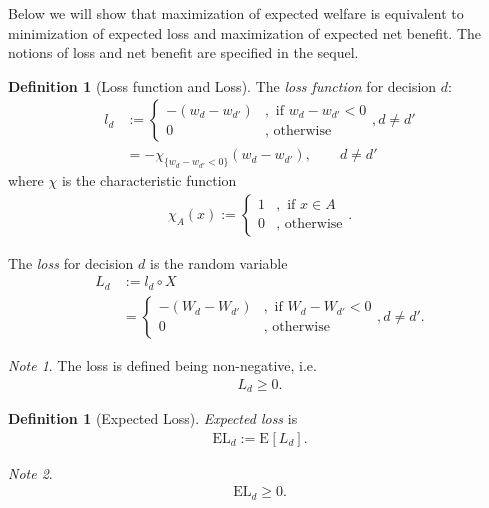 \documentclass[a4paper,10pt,twoside,pagesize,abstracton]{scrartcl}
\newcommand{\E}[2][]{\mathrm{E}_{#1}\left[#2\right]} %
\newcommand{\EL}{\mathrm{EL}} %
\theoremstyle{plain}%
\theoremstyle{definition}
\newtheorem{defn}[thm]{Definition}
\theoremstyle{remark}
\newtheorem*{note}{Note}
\begin{document}
Below we will show that maximization of expected welfare is equivalent to minimization of expected loss and maximization of expected net benefit. The notions of loss and net benefit are specified in the sequel.
\begin{defn}[Loss function and Loss]
 The \emph{loss function} for decision $d$:
  \begin{align}
  l_d &:= 
    \begin{cases} 
     - \left( w_d - w_{d'} \right) &, \textrm{~if~} w_d - w_{d'}  < 0\\
     0 &, \textrm{~otherwise}
    \end{cases},
    d\neq d'\\
    &= - \chi_{\{w_d - w_{d'} < 0\}} \left( w_d - w_{d'} \right), \qquad d\neq d'
 \end{align}
 where $\chi$ is the characteristic function
 \begin{align}
    \chi_A \left(x\right) := 
    \begin{cases} 
     1 &, \textrm{~if~} x \in A\\
     0 &, \textrm{~otherwise}
    \end{cases}.
 \end{align}

 The \emph{loss} for decision $d$ is the random variable
  \begin{align}
    L_d &:= l_d \circ X\\
	&=
	\begin{cases} 
	- \left( W_d - W_{d'} \right) &, \textrm{~if~} W_d - W_{d'}  < 0\\
	0 &, \textrm{~otherwise}
	\end{cases},\nonumber
	d\neq d'.
 \end{align}
\end{defn}
\begin{note} The loss is defined being non-negative, i.e. 
 \begin{align}
  L_d \geq 0.
 \end{align}
\end{note}
\begin{defn}[Expected Loss] 
  \emph{Expected loss} is 
 \begin{align} 
   \EL_d := \E{L_d}.
\end{align}
\end{defn}
\begin{note}
  \begin{align}
  \EL_d \geq 0.
 \end{align}
\end{note}
\end{document}
